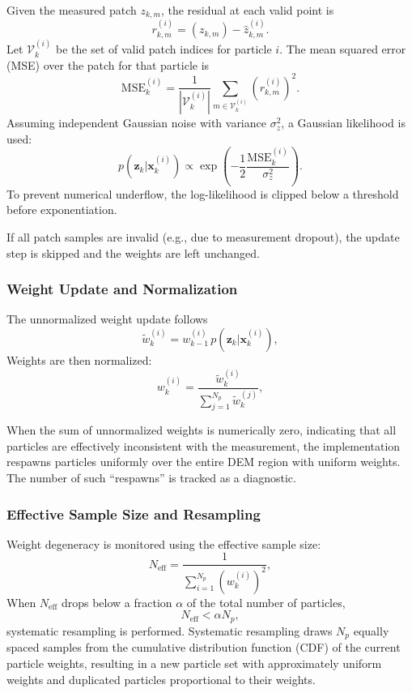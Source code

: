 \documentclass[conference]{IEEEtran}
\begin{document}
Given the measured patch $z_{k,m}$, the residual at each valid point is
\begin{equation}
  r_{k,m}^{(i)} = \left(z_{k,m}\right) - \hat{z}_{k,m}^{(i)}.
\end{equation}
Let $\mathcal{V}_k^{(i)}$ be the set of valid patch indices for particle $i$. The mean squared error (MSE) over the patch for that particle is
\begin{equation}
  \text{MSE}_k^{(i)} = 
  \frac{1}{|\mathcal{V}_k^{(i)}|}
  \sum_{m \in \mathcal{V}_k^{(i)}} \left(r_{k,m}^{(i)}\right)^2.
\end{equation}
Assuming independent Gaussian noise with variance $\sigma_z^2$, a Gaussian likelihood is used:
\begin{equation}
  p(\bm{z}_k|\bm{x}_k^{(i)}) \propto
  \exp\left(
    -\frac{1}{2} \frac{\text{MSE}_k^{(i)}}{\sigma_z^2}
  \right).
\end{equation}
To prevent numerical underflow, the log-likelihood is clipped below a threshold before exponentiation.

If all patch samples are invalid (e.g., due to measurement dropout), the update step is skipped and the weights are left unchanged.

\subsubsection{Weight Update and Normalization}
The unnormalized weight update follows
\begin{equation}
  \tilde{w}_k^{(i)} = w_{k-1}^{(i)} \, p(\bm{z}_k|\bm{x}_k^{(i)}),
  \label{eq:weight_update}
\end{equation}
Weights are then normalized:
\begin{equation}
  w_k^{(i)} = \frac{\tilde{w}_k^{(i)}}{\sum_{j=1}^{N_p} \tilde{w}_k^{(j)}},
  \label{eq:weight_norm}
\end{equation}

When the sum of unnormalized weights is numerically zero, indicating that all particles are effectively inconsistent with the measurement, the implementation respawns particles uniformly over the entire DEM region with uniform weights. The number of such ``respawns'' is tracked as a diagnostic.

\subsubsection{Effective Sample Size and Resampling}
Weight degeneracy is monitored using the effective sample size:
\begin{equation}
  N_{\text{eff}} = \frac{1}{\sum_{i=1}^{N_p} (w_k^{(i)})^2},
  \label{eq:neff}
\end{equation}
 When $N_{\text{eff}}$ drops below a fraction $\alpha$ of the total number of particles,
\begin{equation}
  N_{\text{eff}} < \alpha N_p,
\end{equation}
systematic resampling is performed. Systematic resampling draws $N_p$ equally spaced samples from the cumulative distribution function (CDF) of the current particle weights, resulting in a new particle set with approximately uniform weights and duplicated particles proportional to their weights.
\end{document}

